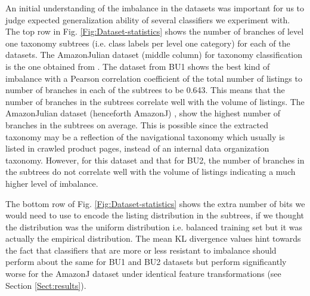 An initial understanding of the imbalance in the datasets was important for us to judge expected generalization ability of several classifiers we experiment with. 
The top row in Fig. \ref{Fig:Dataset-statistics} shows the number of branches of level one taxonomy subtrees (i.e. class labels per level one category) for each of the datasets.
The AmazonJulian dataset (middle column) for taxonomy classification is the one obtained from \cite{Julian15}.
The dataset from BU1 shows the best kind of imbalance with a Pearson correlation coefficient of the total number of listings to number of branches in each of the subtrees to be 0.643.
This means that the number of branches in the subtrees correlate well with the volume of listings.
The AmazonJulian dataset (henceforth AmazonJ) \cite{Julian15}, show the highest number of branches in the subtrees on average.
This is possible since the extracted taxonomy may be a reflection of the navigational taxonomy which usually is listed in crawled product pages, instead of an internal data organization taxonomy.
However, for this dataset and that for BU2, the number of branches in the subtrees do not correlate well with the volume of listings indicating a much higher level of imbalance.

The bottom row of Fig. \ref{Fig:Dataset-statistics} shows the extra number of bits we would need to use to encode the listing distribution in the subtrees, if we thought the distribution was the uniform distribution i.e. balanced training set but it was actually the empirical distribution.
The mean KL divergence values hint towards the fact that classifiers that are more or less resistant to imbalance should perform about the same for BU1 and BU2 datasets but perform significantly worse for the AmazonJ dataset under identical feature transformations (see Section \ref{Sect:results}).
